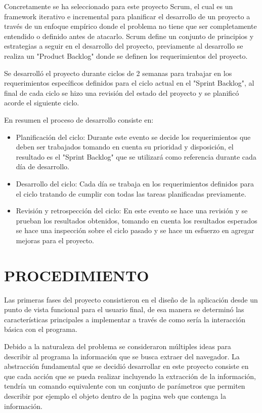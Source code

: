 \documentclass[12pt]{report}
\begin{document}
Concretamente se ha seleccionado para este proyecto Scrum, el cual es un framework iterativo e incremental para planificar el desarrollo de un proyecto a través de un enfoque empírico donde el problema no tiene que ser completamente entendido o definido antes de atacarlo. Scrum define un conjunto de principios y estrategias a seguir en el desarrollo del proyecto, previamente al desarrollo se realiza un "Product Backlog" donde se definen los requerimientos del proyecto.

Se desarrolló el proyecto durante ciclos de 2 semanas para trabajar en los requerimientos específicos definidos para el ciclo actual en el "Sprint Backlog", al final de cada ciclo se hizo una revisión del estado del proyecto y se planificó acorde el siguiente ciclo.

En resumen el proceso de desarrollo consiste en:

\begin{itemize}
\setlength\itemsep{0pt}

\item Planificación del ciclo: Durante este evento se decide los requerimientos que deben ser trabajados tomando en cuenta su prioridad y disposición, el resultado es el "Sprint Backlog" que se utilizará como referencia durante cada día de desarrollo.
\item Desarrollo del ciclo: Cada día se trabaja en los requerimientos definidos para el ciclo tratando de cumplir con todas las tareas planificadas previamente.
\item Revisión y retrospección del ciclo: En este evento se hace una revisión y se prueban los resultados obtenidos, tomando en cuenta los resultados esperados se hace una inspección sobre el ciclo pasado y se hace un esfuerzo en agregar mejoras para el proyecto.

\end{itemize}

\section[Procedimiento]{PROCEDIMIENTO}

Las primeras fases del proyecto consistieron en el diseño de la aplicación desde un punto de vista funcional para el usuario final, de esa manera se determinó las características principales a implementar a través de como sería la interacción básica con el programa. 

Debido a la naturaleza del problema se consideraron múltiples ideas para describir al programa la información que se busca extraer del navegador. La abstracción fundamental que se decidió desarrollar en este proyecto consiste en que cada acción que se pueda realizar incluyendo la extracción de la información, tendría un comando equivalente con un conjunto de parámetros que permiten describir por ejemplo el objeto dentro de la pagina web que contenga la información.
\end{document}
